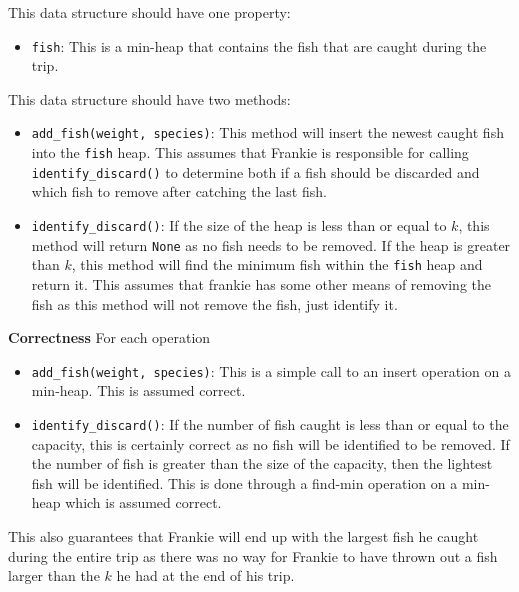 \documentclass[12pt,twoside]{article}
\begin{document}
\begin{problems}
\begin{problemparts}
 This data structure should have one property:
    \begin{itemize}
        \item {\tt fish}: This is a min-heap that contains the fish that are
        caught during the trip.
    \end{itemize}
    This data structure should have two methods:
    \begin{itemize}
        \item {\tt add\_fish(weight, species)}: This method will insert the
        newest caught fish into the {\tt fish} heap. This assumes that
        Frankie is responsible for calling {\tt identify\_discard()} to
        determine both if a fish should be discarded and which fish to remove
        after catching the last fish.
        \item {\tt identify\_discard()}: If the size of the heap is less than
        or equal to $ k $, this method will return {\tt None} as no fish
        needs to be removed. If the heap is greater than $ k $, this method
        will find the minimum fish within the {\tt fish} heap and return it.
        This assumes that frankie has some other means of removing the fish as
        this method will not remove the fish, just identify it.
    \end{itemize}

    \smallbreak

    {\bf Correctness} For each operation
    \begin{itemize}
        \item {\tt add\_fish(weight, species)}: This is a simple call to an
        insert operation on a min-heap. This is assumed correct.
        \item {\tt identify\_discard()}: If the number of fish caught is less
        than or equal to the capacity, this is certainly correct as no fish
        will be identified to be removed. If the number of fish is greater
        than the size of the capacity, then the lightest fish will be
        identified. This is done through a find-min operation on a min-heap
        which is assumed correct.
    \end{itemize}
    This also guarantees that Frankie will end up with the largest fish he
    caught during the entire trip as there was no way for Frankie to have
    thrown out a fish larger than the $ k $ he had at the end of his trip.

    \smallbreak


\end{problemparts}
\end{problems}
\end{document}
